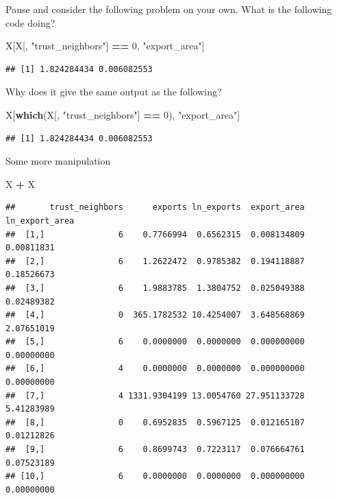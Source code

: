 \documentclass[]{book}
\newenvironment{Shaded}{\begin{snugshade}}{\end{snugshade}}
\newcommand{\DecValTok}[1]{\textcolor[rgb]{0.00,0.00,0.81}{#1}}
\newcommand{\KeywordTok}[1]{\textcolor[rgb]{0.13,0.29,0.53}{\textbf{#1}}}
\newcommand{\NormalTok}[1]{#1}
\newcommand{\OperatorTok}[1]{\textcolor[rgb]{0.81,0.36,0.00}{\textbf{#1}}}
\newcommand{\StringTok}[1]{\textcolor[rgb]{0.31,0.60,0.02}{#1}}
\theoremstyle{definition}
\theoremstyle{definition}
\theoremstyle{definition}
\theoremstyle{remark}
\begin{document}
Pause and consider the following problem on your own. What is the following code doing?

\begin{Shaded}
\begin{Highlighting}[]
\NormalTok{X[X[, }\StringTok{"trust_neighbors"}\NormalTok{] }\OperatorTok{==}\StringTok{ }\DecValTok{0}\NormalTok{, }\StringTok{"export_area"}\NormalTok{]}
\end{Highlighting}
\end{Shaded}

\begin{verbatim}
## [1] 1.824284434 0.006082553
\end{verbatim}

Why does it give the same output as the following?

\begin{Shaded}
\begin{Highlighting}[]
\NormalTok{X[}\KeywordTok{which}\NormalTok{(X[, }\StringTok{"trust_neighbors"}\NormalTok{] }\OperatorTok{==}\StringTok{ }\DecValTok{0}\NormalTok{), }\StringTok{"export_area"}\NormalTok{]}
\end{Highlighting}
\end{Shaded}

\begin{verbatim}
## [1] 1.824284434 0.006082553
\end{verbatim}

Some more manipulation

\begin{Shaded}
\begin{Highlighting}[]
\NormalTok{X }\OperatorTok{+}\StringTok{ }\NormalTok{X}
\end{Highlighting}
\end{Shaded}

\begin{verbatim}
##       trust_neighbors      exports ln_exports  export_area ln_export_area
##  [1,]               6    0.7766994  0.6562315  0.008134809     0.00811831
##  [2,]               6    1.2622472  0.9785382  0.194118887     0.18526673
##  [3,]               6    1.9883785  1.3804752  0.025049388     0.02489382
##  [4,]               0  365.1782532 10.4254007  3.648568869     2.07651019
##  [5,]               6    0.0000000  0.0000000  0.000000000     0.00000000
##  [6,]               4    0.0000000  0.0000000  0.000000000     0.00000000
##  [7,]               4 1331.9304199 13.0054760 27.951133728     5.41283989
##  [8,]               0    0.6952835  0.5967125  0.012165107     0.01212826
##  [9,]               6    0.8699743  0.7223117  0.076664761     0.07523189
## [10,]               6    0.0000000  0.0000000  0.000000000     0.00000000
\end{verbatim}
\end{document}

